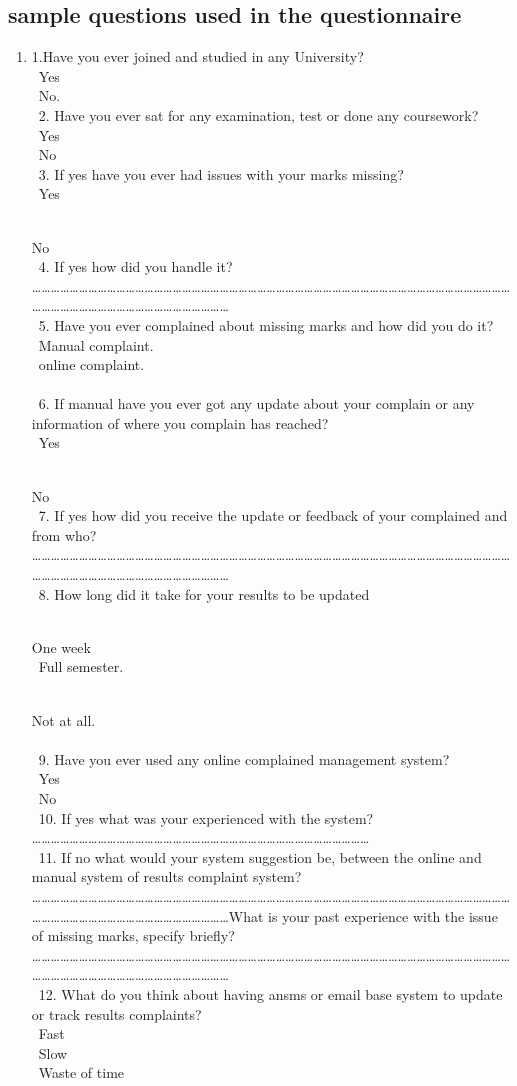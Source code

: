 \documentclass[10pt]{report}
\begin{document}
\subsection{sample questions used in the questionnaire}
\begin{enumerate}
\item 
1.Have you ever joined and studied in any University?\\\
Yes\\\
No.
\\\
2.	Have you ever sat for any examination, test or done any coursework?\\\
Yes\\\
No
\\\
3.	If yes have you ever had issues with your marks missing?\\\
Yes\\\

No
\\\
4.	If yes how did you handle it?
………………………………………………………………………………………………………………………………………………………………………………………………
\\\
5.	Have you ever complained about missing marks and how did you do it?\\\
Manual complaint.\\\
online complaint.\\\
\\\
6.	If manual have you ever got any update about your complain or any information of where you complain has reached?\\\
Yes\\\

No
\\\
7.	If yes how did you receive the update or feedback of your complained and from who?
………………………………………………………………………………………………………………………………………………………………………………………………
\\\
8.	How long did it take for your results to be updated\\\

One week\\\
Full semester.\\\

Not at all.\\\
\\\
9.	Have you ever used any online complained management system?\\\
Yes \\\
No
\\\
10.	If yes what was your experienced with the system?
………………………………………………………………………………………………
\\\
11.	If no what would your system suggestion be, between the online and manual system of results complaint system?
………………………………………………………………………………………………………………………………………………………………………………………………What is your past experience with the issue of missing marks, specify briefly?
………………………………………………………………………………………………………………………………………………………………………………………………
\\\
12.	What do you think about having ansms or email base system to update or track results complaints?\\\
                   Fast\\\
                    Slow\\\
     Waste of time\\\


\end{enumerate}
\end{document}
